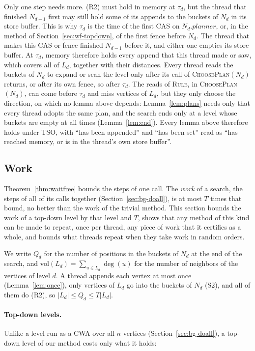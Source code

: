 Only one step needs more. (R2) must hold in memory at $\tau_d$, but the thread that finished $N_{d-1}$ first may still hold some of its appends to the buckets of $N_d$ in its store buffer. This is why $\tau_d$ is the time of the first CAS on $N_d.\mathit{planner}$, or, in the method of Section~\ref{sec:wf-topdown}, of the first fence before $N_d$. The thread that makes this CAS or fence finished $N_{d-1}$ before it, and either one empties its store buffer. At $\tau_d$, memory therefore holds every append that this thread made or saw, which covers all of $L_d$, together with their distances. Every thread reads the buckets of $N_d$ to expand or scan the level only after its call of \textsc{ChoosePlan}$(N_d)$ returns, or after its own fence, so after $\tau_d$. The reads of \textsc{Rule}, in \textsc{ChoosePlan}$(N_d)$, can come before $\tau_d$ and miss vertices of $L_d$, but they only choose the direction, on which no lemma above depends: Lemma~\ref{lem:plans} needs only that every thread adopts the same plan, and the search ends only at a level whose buckets are empty at all times (Lemma~\ref{lem:end}). Every lemma above therefore holds under TSO, with ``has been appended'' and ``has been set'' read as ``has reached memory, or is in the thread's own store buffer''.

\subsection{Work}
\label{sec:pf-work}

Theorem~\ref{thm:waitfree} bounds the steps of one call. The \emph{work} of a search, the steps of all of its calls together (Section~\ref{sec:bg-doall}), is at most $T$ times that bound, no better than the work of the trivial method. This section bounds the work of a top-down level by that level and $T$, shows that any method of this kind can be made to repeat, once per thread, any piece of work that it certifies as a whole, and bounds what threads repeat when they take work in random orders.

We write $Q_d$ for the number of positions in the buckets of $N_d$ at the end of the search, and $\mathrm{vol}(L_d) = \sum_{u \in L_d} \deg(u)$ for the number of neighbors of the vertices of level $d$. A thread appends each vertex at most once (Lemma~\ref{lem:once}), only vertices of $L_d$ go into the buckets of $N_d$ (S2), and all of them do (R2), so $|L_d| \leq Q_d \leq T|L_d|$.

\paragraph{Top-down levels.} Unlike a level run as a CWA over all $n$ vertices (Section~\ref{sec:bg-doall}), a top-down level of our method costs only what it holds:

